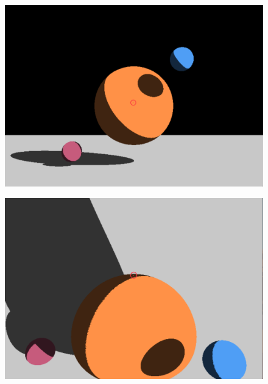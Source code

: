 \documentclass[titlepage]{article}
\begin{document}
\begin{figure}[H]
  \centering
  \begin{minipage}[t]{.4\textwidth}
    \centering
    \includegraphics[width=1\linewidth]{Images/speedup_euclidean_scene.png}
    \label{fig:Speedup euclidean scene}
  \end{minipage}%
  \hspace{0.04\textwidth} %
  \begin{minipage}[t]{.4\textwidth}
    \centering
    \includegraphics[width=1\linewidth]{Images/speedup_2sphere_scene.png}
    \label{fig:Speedup 2sphere scene}
  \end{minipage}
\end{figure}
\end{document}
